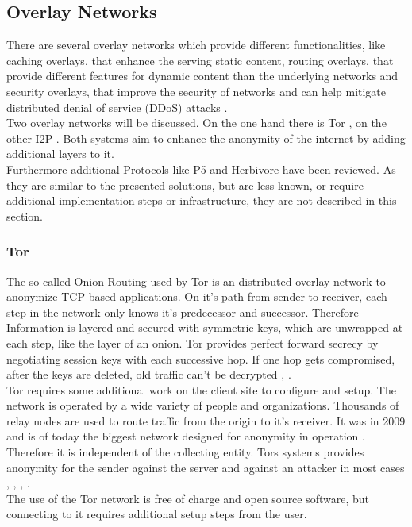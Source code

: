     \subsection{Overlay Networks}
        \label{subsec:related:overlay}
        There are several overlay networks which provide different functionalities, like caching overlays, that enhance the serving static content, routing overlays, that provide different features for dynamic content than the underlying networks and security overlays,  that improve the security of networks and can help mitigate distributed denial of service (DDoS) attacks \cite{pathan_overlay_2014}.\\
        Two overlay networks will be discussed. On the one hand there is Tor \cite{dingledine_tor_2004}, on the other I2P \cite{}. Both systems aim to enhance the anonymity of the internet by adding additional layers to it.\\
        Furthermore additional Protocols like P5 \cite{sherwood_p_2005} and Herbivore \cite{goel_herbivore_2003} have been reviewed. As they are similar to the presented solutions, but are less known, or require additional implementation steps or infrastructure, they are not described in this section.
     
     
    \subsubsection{Tor}
        The so called Onion Routing used  by Tor is an distributed overlay network to anonymize TCP-based applications. On it's path from sender to receiver, each step in the network only knows it's predecessor and successor. Therefore Information is layered and secured with symmetric keys, which are unwrapped at each step, like the layer of an onion.
        Tor provides perfect forward secrecy by negotiating session keys with each successive hop. If one hop gets compromised, after the keys are deleted, old traffic can't be decrypted \cite{dingledine_tor_2004}, \cite{borisov_shining_2008}.\\
        Tor requires some additional work on the client site to configure and setup. 
        The network is operated by a wide variety of people and organizations.
        Thousands of relay nodes are used to route traffic from the origin to it's receiver. It was in 2009 and is of today the biggest network designed for anonymity in operation \cite{edman_anonymity_2009}.
        Therefore it is independent of the collecting entity. Tors systems provides anonymity for the sender against the server and against an attacker in most cases \cite{arma_one_2009},  \cite{poulsen_feds_2013}, \cite{samson_tor_2013}, \cite{herrmann_website_2009}.\\
        The use of the Tor network is free of charge and open source software, but connecting to it requires additional setup steps from the user.\\
    
